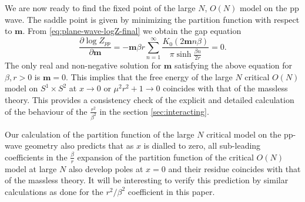 \documentclass[a4paper,11pt]{article}
\begin{document}
We are now ready to find the fixed point of the large $N$,  $O(N)$ model  on the pp wave. 
The saddle point is given by  minimizing the partition function 
with respect to $\mathbf m$.  
From 
\eqref{eq:plane-wave-logZ-final} we obtain the gap equation
\begin{equation}
	\frac{\partial\log Z_{pp} }{\partial \mathbf m}
	=-\mathbf m\beta    r\sum_{n=1}^\infty\frac{  K_0(2 \mathbf m n \beta ) }{\pi \sinh\frac{\beta n}{2r}}=0.
	\label{eq:plane-wave-gap}
\end{equation}
The only real and non-negative solution  for $\mathbf m$ satisfying the above equation for $\beta, r >0$ is 
$\mathbf m=0$.  
This implies that the free energy of the large $N$ critical  $O(N)$ model  on $S^1\times S^2$ 
at $x\rightarrow 0$  or $\mu^2 r^2 + 1\rightarrow 0$
coincides with that of the massless theory. 
This provides a consistency check of the explicit  and detailed calculation of the behaviour   of the $\frac{r^2}{\beta^2}$  in the section \ref{sec:interacting}. 

Our calculation of the partition function of the large $N$ critical model on the pp-wave  geometry also predicts  that 
as $x$ is dialled to zero, all sub-leading coefficients  in the $\frac{\beta}{r}$ expansion  of the partition function of the critical 
$O(N)$ model at large $N$ also develop poles at $x=0$ and their residue coincides with that of the massless theory. 
It will be interesting to verify this prediction by similar calculations as done for the $r^2/\beta^2$ coefficient in this paper.
\end{document}
